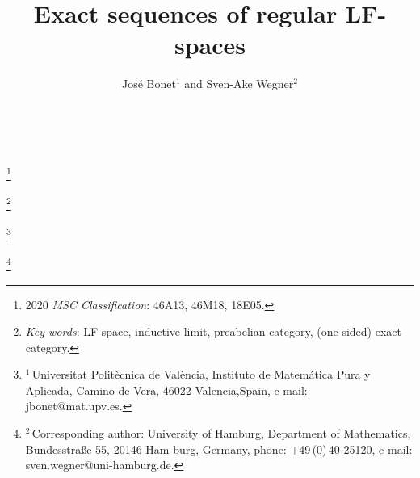 \documentclass[11pt, a4paper, reqno]{amsart}
\theoremstyle{definition}
\begin{document}
\allowdisplaybreaks
$ $
\vspace{-50pt}

\title{Exact sequences of regular LF-spaces}



\author{Jos\'e Bonet\hspace{0.75pt}$^{\text{1}}$ and Sven-Ake Wegner\hspace{0.5pt}$^{\text{2}}$}

\renewcommand{\thefootnote}{}
\hspace{-1000pt}\footnote{\hspace{5.5pt}2020 \emph{MSC Classification}: 46A13, 46M18, 18E05.\vspace{1pt}}



\hspace{-1000pt}\footnote{\hspace{5.5pt}\emph{Key words}: LF-space, inductive limit, preabelian category, (one-sided) exact category. \vspace{1pt}}

\hspace{-1000pt}\footnote{\hspace{0pt}$^{1}$\,Universitat Polit\`ecnica de Val\`encia, Instituto de Matem\'atica Pura y Aplicada, Camino de Vera, 46022 Valencia,\linebreak\phantom{x}\hspace{1.2pt}Spain, e-mail: jbonet@mat.upv.es.\vspace{1.6pt}}

\hspace{-1000pt}\footnote{\hspace{0pt}$^{2}$\,Corresponding author: University of Hamburg, Department of Mathematics, Bundesstra\ss{}e 55, 20146 Ham-\linebreak\phantom{x}\hspace{1.2pt}burg, Germany, phone: +49\,(0)\,40\hspace{1pt}-\hspace{1pt}25120, e-mail: sven.wegner@uni-hamburg.de.\vspace{1.6pt}}
\end{document}
